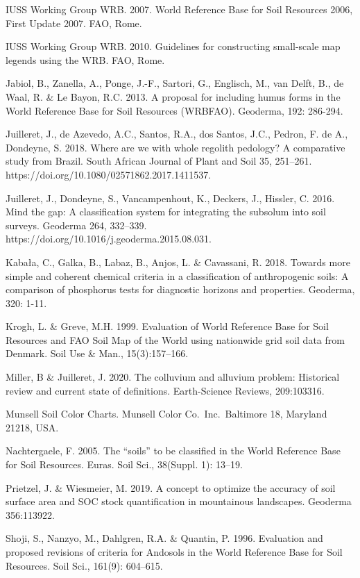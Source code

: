 \documentclass[
  letterpaper,
  DIV=11,
  numbers=noendperiod]{scrreprt}
\begin{document}
IUSS Working Group WRB. 2007. World Reference Base for Soil Resources
2006, First Update 2007. FAO, Rome.

IUSS Working Group WRB. 2010. Guidelines for constructing small-scale
map legends using the WRB. FAO, Rome.

Jabiol, B., Zanella, A., Ponge, J.-F., Sartori, G., Englisch, M., van
Delft, B., de Waal, R. \& Le Bayon, R.C. 2013. A proposal for including
humus forms in the World Reference Base for Soil Resources (WRBFAO).
Geoderma, 192: 286-294.

Juilleret, J., de Azevedo, A.C., Santos, R.A., dos Santos, J.C., Pedron,
F. de A., Dondeyne, S. 2018. Where are we with whole regolith pedology?
A comparative study from Brazil. South African Journal of Plant and Soil
35, 251--261. https://doi.org/10.1080/02571862.2017.1411537.

Juilleret, J., Dondeyne, S., Vancampenhout, K., Deckers, J., Hissler, C.
2016. Mind the gap: A classification system for integrating the subsolum
into soil surveys. Geoderma 264, 332--339.
https://doi.org/10.1016/j.geoderma.2015.08.031.

Kabała, C., Galka, B., Labaz, B., Anjos, L. \& Cavassani, R. 2018.
Towards more simple and coherent chemical criteria in a classification
of anthropogenic soils: A comparison of phosphorus tests for diagnostic
horizons and properties. Geoderma, 320: 1-11.

Krogh, L. \& Greve, M.H. 1999. Evaluation of World Reference Base for
Soil Resources and FAO Soil Map of the World using nationwide grid soil
data from Denmark. Soil Use \& Man., 15(3):157--166.

Miller, B \& Juilleret, J. 2020. The colluvium and alluvium problem:
Historical review and current state of definitions. Earth-Science
Reviews, 209:103316.

Munsell Soil Color Charts. Munsell Color Co.~Inc.~Baltimore 18, Maryland
21218, USA.

Nachtergaele, F. 2005. The ``soils'' to be classified in the World
Reference Base for Soil Resources. Euras. Soil Sci., 38(Suppl. 1):
13--19.

Prietzel, J. \& Wiesmeier, M. 2019. A concept to optimize the accuracy
of soil surface area and SOC stock quantification in mountainous
landscapes. Geoderma 356:113922.

Shoji, S., Nanzyo, M., Dahlgren, R.A. \& Quantin, P. 1996. Evaluation
and proposed revisions of criteria for Andosols in the World Reference
Base for Soil Resources. Soil Sci., 161(9): 604--615.
\end{document}
